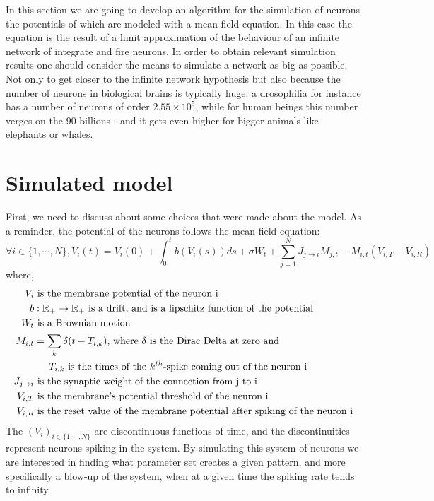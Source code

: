 \documentclass{article}
\begin{document}
		\indent In this section we are going to develop an algorithm for the simulation of neurons the potentials of which are modeled with a mean-field equation. In this case the equation is the result of a limit approximation of the behaviour of an infinite network of integrate and fire neurons. In order to obtain relevant simulation results one should consider the means to simulate a network as big as possible. Not only to get closer to the infinite network hypothesis but also because the number of neurons in biological brains is typically huge: a drosophilia for instance has a number of neurons of order $2.55\times10^5$, while for human beings this number verges on the 90 billions - and it gets even higher for bigger animals like elephants or whales.\\\indent
	\section{Simulated model}\label{sec:model}
		\indent First, we need to discuss about some choices that were made about the model. As a reminder, the potential of the neurons follows the mean-field equation:\\\indent
		\begin{equation}
			\forall i\in\{1,\cdots,N\}, V_i(t)=V_i(0)+\int_0^t b(V_i(s))ds+\sigma W_t+\sum_{j=1}^NJ_{j\to i}M_{j,t}-M_{i,t}(V_{i,T}-V_{i,R})
		\end{equation}
		where,\begin{align*}
			V_i			& \text{ is the membrane potential of the neuron i}\\
			b			& :\mathbb{R}_{+}\to\mathbb{R}_+\text{ is a drift, and is a lipschitz function of the potential}\\
			W_t			& \text{ is a Brownian motion}\\
			M_{i,t}		& =\sum_k\delta(t-T_{i,k})\text{, where }\delta\text{ is the Dirac Delta at zero and}\\
						& \indent T_{i,k}\text{ is the times of the }k^{th}\text{-spike coming out of the neuron i}\\
			J_{j\to i}	& \text{ is the synaptic weight of the connection from j to i}\\
			V_{i,T}		& \text{ is the membrane's potential threshold of the neuron i}\\
			V_{i,R}		& \text{ is the reset value of the membrane potential after spiking of the neuron i}
		\end{align*}
		The $(V_i)_{i\in\{1,\cdots,N\}}$ are discontinuous functions of time, and the discontinuities represent neurons spiking in the system. By simulating this system of neurons we are interested in finding what parameter set creates a given pattern, and more specifically a blow-up of the system, when at a given time the spiking rate tends to infinity.\\\indent
\end{document}
